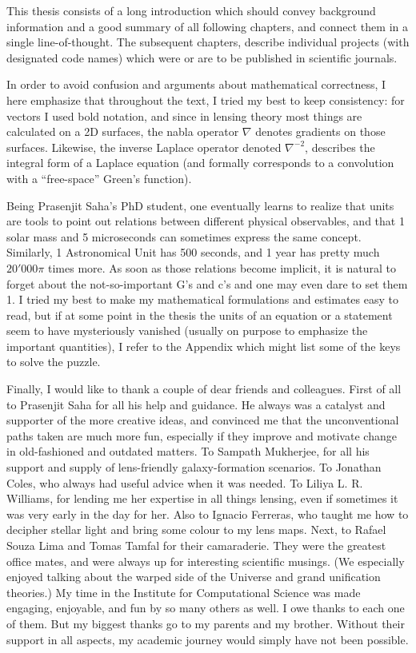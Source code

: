 \small
This thesis consists of a long introduction which should convey background
information and a good summary of all following chapters, and connect them in a
single line-of-thought.  The subsequent chapters, describe individual projects
(with designated code names) which were or are to be published in scientific
journals.

In order to avoid confusion and arguments about mathematical correctness, I here
emphasize that throughout the text, I tried my best to keep consistency: for
vectors I used bold notation, and since in lensing theory most things are
calculated on a 2D surfaces, the nabla operator $\nabla$ denotes gradients on
those surfaces.  Likewise, the inverse Laplace operator denoted $\nabla^{-2}$,
describes the integral form of a Laplace equation (and formally corresponds to a
convolution with a ``free-space'' Green's function).

Being Prasenjit Saha's PhD student, one eventually learns to realize that
units are tools to point out relations between different physical observables,
and that 1 solar mass and 5 microseconds can sometimes express the same concept.
Similarly, 1 Astronomical Unit has 500 seconds, and 1 year has pretty much
$20'000\pi$ times more.  As soon as those relations become implicit, it is
natural to forget about the not-so-important G's and c's and one may even dare
to set them 1.  I tried my best to make my mathematical formulations and
estimates easy to read, but if at some point in the thesis the units of an
equation or a statement seem to have mysteriously vanished (usually on purpose
to emphasize the important quantities), I refer to the Appendix which might list
some of the keys to solve the puzzle.

Finally, I would like to thank a couple of dear friends and colleagues.  First
of all to Prasenjit Saha for all his help and guidance.  He always was a
catalyst and supporter of the more creative ideas, and convinced me that the
unconventional paths taken are much more fun, especially if they improve and
motivate change in old-fashioned and outdated matters.  To Sampath Mukherjee,
for all his support and supply of lens-friendly galaxy-formation scenarios.  To
Jonathan Coles, who always had useful advice when it was needed.  To Liliya L.
R. Williams, for lending me her expertise in all things lensing, even if
sometimes it was very early in the day for her.  Also to Ignacio Ferreras, who
taught me how to decipher stellar light and bring some colour to my lens maps.
Next, to Rafael Souza Lima and Tomas Tamfal for their camaraderie.  They were
the greatest office mates, and were always up for interesting scientific
musings.  (We especially enjoyed talking about the warped side of the Universe
and grand unification theories.)  My time in the Institute for Computational
Science was made engaging, enjoyable, and fun by so many others as well. I owe
thanks to each one of them.  But my biggest thanks go to my parents and my
brother.  Without their support in all aspects, my academic journey would simply
have not been possible.
\normalsize
